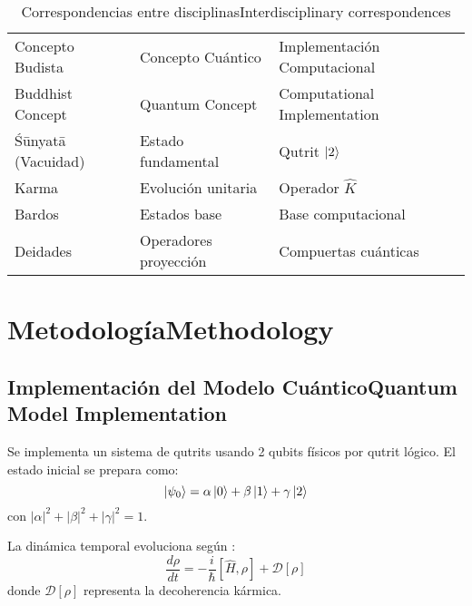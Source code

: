 \documentclass[12pt,a4paper]{article}
\newcommand{\es}[1]{\foreignlanguage{spanish}{#1}}
\newcommand{\en}[1]{\foreignlanguage{english}{#1}}
\begin{document}
\begin{otherlanguage}{spanish}
\begin{table}[H]
\centering
\caption{\es{Correspondencias entre disciplinas}\en{Interdisciplinary correspondences}}
\begin{tabular}{p{} p{} p{}}
\toprule
\es{Concepto Budista} & \es{Concepto Cuántico} & \es{Implementación Computacional} \\
\en{Buddhist Concept} & \en{Quantum Concept} & \en{Computational Implementation} \\
\midrule
Śūnyatā (Vacuidad) & Estado fundamental & Qutrit $\ket{2}$ \\
Karma & Evolución unitaria & Operador $\hat{K}$ \\
Bardos & Estados base & Base computacional \\
Deidades & Operadores proyección & Compuertas cuánticas \\
\bottomrule
\end{tabular}
\end{table}
\end{otherlanguage}

\section{\es{Metodología}\en{Methodology}}

\subsection{\es{Implementación del Modelo Cuántico}\en{Quantum Model Implementation}}

\begin{otherlanguage}{spanish}
Se implementa un sistema de qutrits usando 2 qubits físicos por qutrit lógico. El estado inicial se prepara como:
\begin{equation}
\ket{\psi_0} = \alpha\ket{0} + \beta\ket{1} + \gamma\ket{2}
\end{equation}
con $|\alpha|^2 + |\beta|^2 + |\gamma|^2 = 1$.

La dinámica temporal evoluciona según \cite{fisher2015}:
\begin{equation}
\frac{d\rho}{dt} = -\frac{i}{\hbar}[\hat{H}, \rho] + \mathcal{D}[\rho]
\end{equation}
donde $\mathcal{D}[\rho]$ representa la decoherencia kármica.
\end{otherlanguage}
\end{document}
